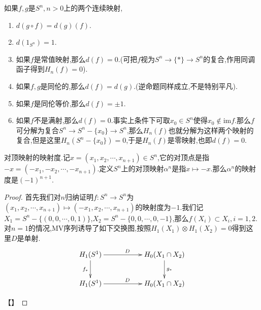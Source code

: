 如果$f,g$是$S^n,n>0$上的两个连续映射,
\begin{enumerate}
	\item $d(g\circ f)=d(g)(f)$.
	\item $d(1_{S^n})=1$.
	\item 如果$f$是常值映射,那么$d(f)=0$.(可把$f$视为$S^n\to\{*\}\to S^n$的复合,作用同调函子得到$H_n(f)=0$).
	\item 如果$f,g$是同伦的,那么$d(f)=d(g)$.(逆命题同样成立,不是特别平凡).
	\item 如果$f$是同伦等价,那么$d(f)=\pm1$.
	\item 如果$f$不是满射,那么$d(f)=0$.事实上条件下可取$x_0\in S^n$使得$x_0\not\in\mathrm{im}f$.那么$f$可分解为复合$S^n\to S^n-\{x_0\}\to S^n$,那么$H_n(f)$也就分解为这样两个映射的复合,但是这里$H_n(S^n-\{x_0\})=0$,于是$H_n(f)$是零映射,也即$d(f)=0$.
\end{enumerate}

对顶映射的映射度.记$x=(x_1,x_2,\cdots,x_{n+1})\in S^n$,它的对顶点是指$-x=(-x_1,-x_2,\cdots,-x_{n+1})$.定义$S^n$上的对顶映射$\alpha^n$是指$x\mapsto -x$.那么$\alpha^n$的映射度是$(-1)^{n+1}$.
\begin{proof}
	
	首先我们对$n$归纳证明$f:S^n\to S^n$为$(x_1,x_2,\cdots,x_{n+1})\mapsto(-x_1,x_2,\cdots,x_{n+1})$的映射度为$-1$.我们记$X_1=S^n-\{(0,0,\cdots,0,1)\}$,$X_2=S^n-\{0,0,\cdots,0,-1\}$,那么$f(X_i)\subset X_i,i=1,2$.对$n=1$的情况,MV序列诱导了如下交换图,按照$H_1(X_1)\otimes H_1(X_2)=0$得到这里$D$是单射.
	$$\xymatrix{H_1(S^1)\ar[rr]^D\ar[d]_{f_*}&&H_0(X_1\cap X_2)\ar[d]^{g_*}\\H_1(S^1)\ar[rr]^D&&H_0(X_1\cap X_2)}$$
	
	【】
\end{proof}


